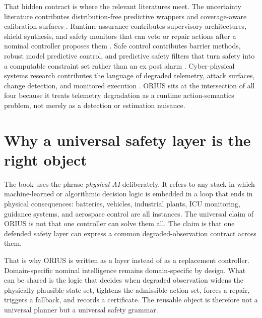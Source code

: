 That hidden contract is where the relevant literatures meet.  The uncertainty literature
contributes distribution-free predictive wrappers and coverage-aware calibration
surfaces \cite{vovk2005algorithmic,lei2018distribution,romano2019conformalized,gibbs2021adaptive,angelopoulos2023gentle,barber2023beyond,zaffran2022adaptive,stankeviciute2021conformal,xu2021dynamic,sesia2021comparison,bates2021distribution}.  Runtime assurance contributes supervisory architectures,
shield synthesis, and safety monitors that can veto or repair actions after a nominal
controller proposes them \cite{sha2001using,sha1998simplex,desai2019soter,bloem2015shield,bartocci2018introduction,havelund2004runtime,leucker2009brief,schierman2015run,bak2011runtime}.  Safe control contributes barrier methods,
robust model predictive control, and predictive safety filters that turn safety into a
computable constraint set rather than an ex post alarm \cite{ames2019control,ames2014cbf,wabersich2021predictive,nguyen2016exponential,wang2017safety,fisac2019general,mayne2005robust,langson2004tubes,rawlings2017mpc,ben2009robust,camacho2013model}.  Cyber-physical
systems research contributes the language of degraded telemetry, attack surfaces, change
detection, and monitored execution \cite{rajkumar2010cps,derler2012modeling,baheti2011cyberphysical,pasqualetti2013attack,teixeira2015secure,basseville1993detection,page1954continuous,page1955test,hinkley1971inference,liu2008isolation,breunig2000lof}.  ORIUS sits at the intersection of all
four because it treats telemetry degradation as a runtime action-semantics problem, not
merely as a detection or estimation nuisance.

\section{Why a universal safety layer is the right object}
The book uses the phrase \emph{physical AI} deliberately.  It refers to any stack in
which machine-learned or algorithmic decision logic is embedded in a loop that ends in
physical consequences: batteries, vehicles, industrial plants, ICU monitoring, guidance
systems, and aerospace control are all instances.  The universal claim of ORIUS is not
that one controller can solve them all.  The claim is that one defended safety layer can
express a common degraded-observation contract across them.

That is why ORIUS is written as a layer instead of as a replacement controller.
Domain-specific nominal intelligence remains domain-specific by design.  What can be
shared is the logic that decides when degraded observation widens the physically
plausible state set, tightens the admissible action set, forces a repair, triggers a
fallback, and records a certificate.  The reusable object is therefore not a universal
planner but a universal safety grammar.

